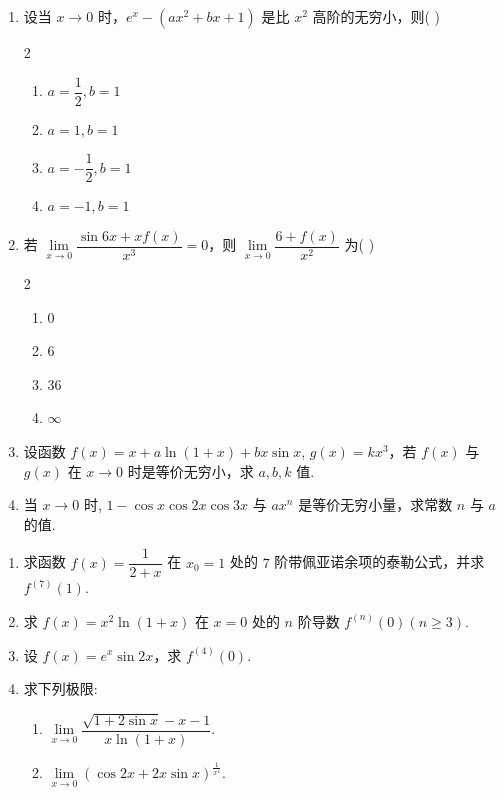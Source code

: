 \begin{enumerate}[label=\textbf{\arabic*.}, itemsep=6cm]
    \item 设当 $x \to 0$ 时，$e^x - \left(ax^2 + bx + 1\right)$ 是比 $x^2$ 高阶的无穷小，则( )
    \begin{multicols}{2}
    \begin{enumerate}
        \item $a=\dfrac{1}{2}, b=1$
        \item $a=1, b=1$
        \item $a=-\dfrac{1}{2}, b=1$
        \item $a=-1, b=1$
    \end{enumerate}
    \end{multicols}
    
    \item 若 $\lim\limits_{x \to 0} \dfrac{\sin 6x + x f(x)}{x^3} = 0$，则 $\lim\limits_{x \to 0} \dfrac{6 + f(x)}{x^2}$ 为( )
    \begin{multicols}{2}
    \begin{enumerate}
        \item $0$
        \item $6$
        \item $36$
        \item $\infty$
    \end{enumerate}
    \end{multicols}
    
    \item 设函数 $f(x) = x + a\ln(1+x) + bx\sin x$, $g(x) = kx^3$，若 $f(x)$ 与 $g(x)$ 在 $x \to 0$ 时是等价无穷小，求 $a,b,k$ 值.
    
    \item 当 $x \to 0$ 时, $1-\cos x\cos2x\cos3x$ 与 $ax^n$ 是等价无穷小量，求常数 $n$ 与 $a$ 的值.
\end{enumerate}

\newpage

\begin{enumerate}[label=\textbf{\arabic*.}, itemsep=6cm, resume]
    \item 求函数 $f(x) = \dfrac{1}{2+x}$ 在 $x_0=1$ 处的 $7$ 阶带佩亚诺余项的泰勒公式，并求 $f^{(7)}(1)$.
    
    \item 求 $f(x) = x^2\ln(1+x)$ 在 $x=0$ 处的 $n$ 阶导数 $f^{(n)}(0)(n \ge 3)$.
    
    \item 设 $f(x) = e^x\sin 2x$，求 $f^{(4)}(0)$.
    
    \item 求下列极限:
    \begin{enumerate}[label=(\arabic*)]
        \item $\lim\limits_{x \to 0} \dfrac{\sqrt{1+2\sin x} - x - 1}{x\ln(1+x)}$.
        \item $\lim\limits_{x \to 0} (\cos 2x + 2x\sin x)^{\frac{1}{x^4}}$.
    \end{enumerate}
\end{enumerate}

